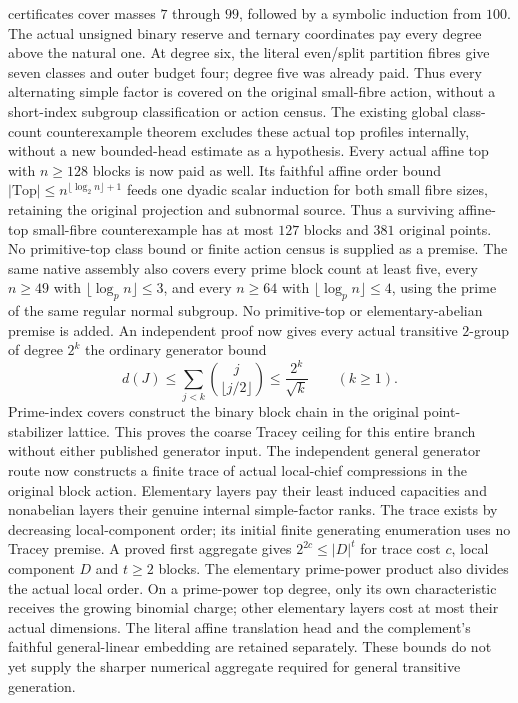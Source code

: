certificates cover masses $7$ through $99$, followed by a symbolic
induction from $100$. The actual unsigned binary reserve and ternary
coordinates pay every degree above the natural one. At degree six,
the literal even/split partition fibres give seven classes and outer
budget four; degree five was already paid. Thus every alternating
simple factor is covered on the original small-fibre action, without a
short-index subgroup classification or action census.
The existing global class-count counterexample theorem excludes these
actual top profiles internally, without a new bounded-head estimate
as a hypothesis.
Every actual affine top with $n\geq128$ blocks is now paid as well.
Its faithful affine order bound $|\mathrm{Top}|\leq n^{\lfloor\log_2n\rfloor+1}$
feeds one dyadic scalar induction for both small fibre sizes, retaining
the original projection and subnormal source. Thus a surviving
affine-top small-fibre counterexample has at most $127$ blocks and
$381$ original points. No primitive-top class bound or finite action
census is supplied as a premise.
The same native assembly also covers every prime block count at least
five, every $n\geq49$ with $\lfloor\log_p n\rfloor\leq3$, and every
$n\geq64$ with $\lfloor\log_p n\rfloor\leq4$, using the prime of the
same regular normal subgroup. No primitive-top or elementary-abelian
premise is added.
An independent proof now gives every actual transitive $2$-group of
degree $2^k$ the ordinary generator bound
\[
  d(J)\leq\sum_{j<k}\binom{j}{\lfloor j/2\rfloor}
       \leq\frac{2^k}{\sqrt{k}}\qquad(k\geq1).
\]
Prime-index covers construct the binary block chain in the original
point-stabilizer lattice. This proves the coarse Tracey ceiling for
this entire branch without either published generator input.
The independent general generator route now constructs a finite trace
of actual local-chief compressions in the original block action.
Elementary layers pay their least induced capacities and nonabelian
layers their genuine internal simple-factor ranks. The trace exists by
decreasing local-component order; its initial finite generating
enumeration uses no Tracey premise. A proved first aggregate gives
$2^{2c}\leq |D|^t$ for trace cost $c$, local component $D$ and $t\geq2$
blocks. The elementary prime-power product also divides the actual
local order. On a prime-power top degree, only its own characteristic
receives the growing binomial charge; other elementary layers cost at
most their actual dimensions. The literal affine translation head and
the complement's faithful general-linear embedding are retained
separately. These bounds do not yet supply the sharper numerical
aggregate required for general transitive generation.

